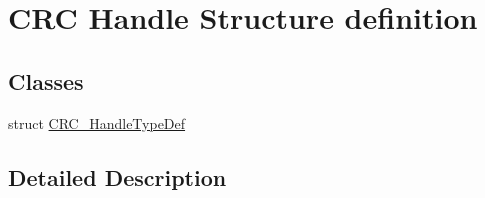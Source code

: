 \hypertarget{group___c_r_c___exported___types___group2}{}\section{C\+RC Handle Structure definition}
\label{group___c_r_c___exported___types___group2}
\subsection*{Classes}
\begin{DoxyCompactItemize}
\item 
struct \hyperlink{struct_c_r_c___handle_type_def}{C\+R\+C\+\_\+\+Handle\+Type\+Def}
\end{DoxyCompactItemize}


\subsection{Detailed Description}
